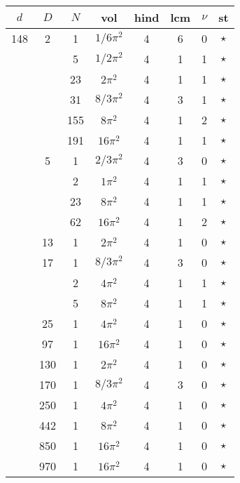 \documentclass[12pt]{amsart}
\providecommand{\DIFadd}[1]{{\protect\color{blue}\uwave{#1}}} %
\providecommand{\DIFdel}[1]{{\protect\color{red}\sout{#1}}}                      %
\providecommand{\DIFaddbegin}{} %
\providecommand{\DIFaddend}{} %
\providecommand{\DIFdelbegin}{} %
\providecommand{\DIFdelend}{} %
\begin{document}
\begin{tabular}{ccc|ccccc}
$d$ & $D$ & $N$ & vol & hind & lcm & $\nu$ & st\\
\hline
148 & 2 & 1 & \DIFdelbegin \DIFdel{$1/6\pi^2$ }\DIFdelend \DIFaddbegin \DIFadd{$(1/6)\pi^2$ }\DIFaddend & 4 & 6 & 0 & $\star$ \\
 &  & 5 & \DIFdelbegin \DIFdel{$1/2\pi^2$ }\DIFdelend \DIFaddbegin \DIFadd{$(1/2)\pi^2$ }\DIFaddend & 4 & 1 & 1 & $\star$ \\
 &  & 23 & $2\pi^2$ & 4 & 1 & 1 & $\star$ \\
 &  & 31 & \DIFdelbegin \DIFdel{$8/3\pi^2$ }\DIFdelend \DIFaddbegin \DIFadd{$(8/3)\pi^2$ }\DIFaddend & 4 & 3 & 1 & $\star$ \\
 &  & 155 & $8\pi^2$ & 4 & 1 & 2 & $\star$ \\
 &  & 191 & $16\pi^2$ & 4 & 1 & 1 & $\star$ \\
 & 5 & 1 & \DIFdelbegin \DIFdel{$2/3\pi^2$ }\DIFdelend \DIFaddbegin \DIFadd{$(2/3)\pi^2$ }\DIFaddend & 4 & 3 & 0 & $\star$ \\
 &  & 2 & \DIFdelbegin \DIFdel{$1\pi^2$ }\DIFdelend \DIFaddbegin \DIFadd{$\pi^2$ }\DIFaddend & 4 & 1 & 1 & $\star$ \\
 &  & 23 & $8\pi^2$ & 4 & 1 & 1 & $\star$ \\
 &  & 62 & $16\pi^2$ & 4 & 1 & 2 & $\star$ \\
 & 13 & 1 & $2\pi^2$ & 4 & 1 & 0 & $\star$ \\
 & 17 & 1 & \DIFdelbegin \DIFdel{$8/3\pi^2$ }\DIFdelend \DIFaddbegin \DIFadd{$(8/3)\pi^2$ }\DIFaddend & 4 & 3 & 0 & $\star$ \\
 &  & 2 & $4\pi^2$ & 4 & 1 & 1 & $\star$ \\
 &  & 5 & $8\pi^2$ & 4 & 1 & 1 & $\star$ \\
 & 25 & 1 & $4\pi^2$ & 4 & 1 & 0 & $\star$ \\
 & 97 & 1 & $16\pi^2$ & 4 & 1 & 0 & $\star$ \\
 & 130 & 1 & $2\pi^2$ & 4 & 1 & 0 & $\star$ \\
 & 170 & 1 & \DIFdelbegin \DIFdel{$8/3\pi^2$ }\DIFdelend \DIFaddbegin \DIFadd{$(8/3)\pi^2$ }\DIFaddend & 4 & 3 & 0 & $\star$ \\
 & 250 & 1 & $4\pi^2$ & 4 & 1 & 0 & $\star$ \\
 & 442 & 1 & $8\pi^2$ & 4 & 1 & 0 & $\star$ \\
 & 850 & 1 & $16\pi^2$ & 4 & 1 & 0 & $\star$ \\
 & 970 & 1 & $16\pi^2$ & 4 & 1 & 0 & $\star$ \\

\end{tabular}
\end{document}
